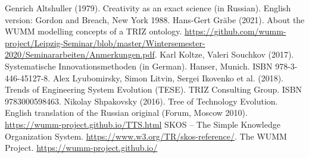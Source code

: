 \documentclass[11pt,a4paper]{article}
\begin{document}
\begin{thebibliography}{xxx}
\raggedright
{} Genrich Altshuller (1979).  Creativity as an exact
  science (in Russian). English version: Gordon and Breach, New York 1988.
 Hans-Gert Gr\"abe (2021). About the WUMM modelling
  concepts of a TRIZ ontology.  \url{https://github.com/wumm-project/Leipzig-Seminar/blob/master/Wintersemester-2020/Seminararbeiten/Anmerkungen.pdf}.
 Karl Koltze, Valeri Souchkov (2017).  Systematische
  Innovationsmethoden (in German).  Hanser, Munich. ISBN 978-3-446-45127-8.
 Alex Lyubomirsky, Simon Litvin, Sergei Ikovenko et al.
  (2018). Trends of Engineering System Evolution (TESE).  TRIZ Consulting
  Group. ISBN 9783000598463.
 Nikolay Shpakovsky (2016). Tree of Technology
  Evolution. English translation of the Russian original (Forum, Moscow
  2010).\\ \url{https://wumm-project.github.io/TTS.html}
 SKOS -- The Simple Knowledge Organization System.
  \url{https://www.w3.org/TR/skos-reference/}.  
 The WUMM Project. \url{https://wumm-project.github.io/} 
\end{thebibliography}
\end{document}
